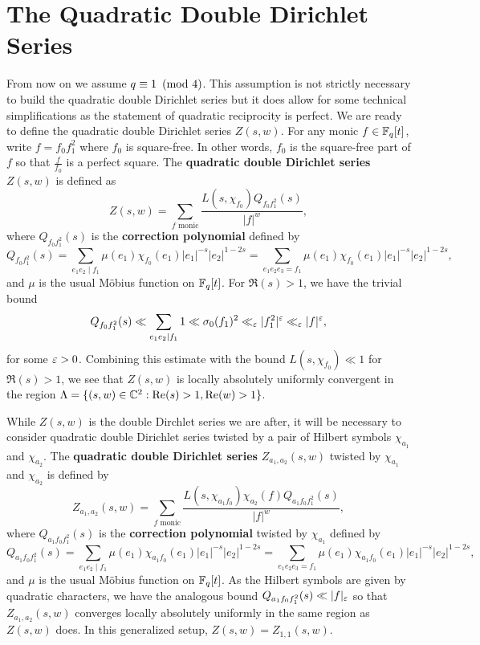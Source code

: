 \documentclass[12pt,reqno,oneside]{amsart}
\begin{document}
\section{The Quadratic Double Dirichlet Series}
    From now on we assume $q \equiv 1 \ \left(\text{mod }4\right)$. This assumption is not strictly necessary to build the quadratic double Dirichlet series but it does allow for some technical simplifications as the statement of quadratic reciprocity is perfect. We are ready to define the quadratic double Dirichlet series $Z(s,w)$. For any monic $f \in \mathbb{F}_{q}[t]$, write $f = f_{0}f_{1}^{2}$ where $f_{0}$ is square-free. In other words, $f_{0}$ is the square-free part of $f$ so that $\frac{f}{f_{0}}$ is a perfect square. The \textbf{quadratic double Dirichlet series} $Z(s,w)$ is defined as
    \[
        Z(s,w) = \sum_{\text{$f$ monic}}\frac{L(s,\chi_{f_{0}})Q_{f_{0}f_{1}^{2}}(s)}{|f|^{w}},
    \]
    where $Q_{f_{0}f_{1}^{2}}(s)$ is the \textbf{correction polynomial} defined by
    \[
        Q_{f_{0}f_{1}^{2}}(s) = \sum_{e_{1}e_{2} \mid f_{1}}\mu(e_{1})\chi_{f_{0}}(e_{1})|e_{1}|^{-s}|e_{2}|^{1-2s} = \sum_{e_{1}e_{2}e_{3} = f_{1}}\mu(e_{1})\chi_{f_{0}}(e_{1})|e_{1}|^{-s}|e_{2}|^{1-2s},
    \]
    and $\mu$ is the usual M\"obius function on $\mathbb{F}_{q}[t]$. For $\Re(s) > 1$, we have the trivial bound
    \[
        Q_{f_{0}f_{1}^{2}}(s) \ll \sum_{e_{1}e_{2} \mid f_{1}}1 \ll \sigma_{0}(f_{1})^{2} \ll_{\varepsilon} |f_{1}^{2}|^{\varepsilon} \ll_{\varepsilon} |f|^{\varepsilon},
    \]
    for some $\varepsilon > 0$. Combining this estimate with the bound $L(s,\chi_{f_{0}}) \ll 1$ for $\Re(s) > 1$, we see that $Z(s,w)$ is locally absolutely uniformly convergent in the region $\Lambda = \{(s,w) \in \mathbb{C}^{2}:\mathrm{Re}(s) > 1, \mathrm{Re}(w) > 1\}$.

    While $Z(s,w)$ is the double Dirchlet series we are after, it will be necessary to consider quadratic double Dirichlet series twisted by a pair of Hilbert symbols $\chi_{a_{1}}$ and $\chi_{a_{2}}$. The \textbf{quadratic double Dirichlet series} $Z_{a_{1},a_{2}}(s,w)$ twisted by $\chi_{a_{1}}$ and $\chi_{a_{2}}$ is defined by
    \[
        Z_{a_{1},a_{2}}(s,w) = \sum_{\text{$f$ monic}}\frac{L(s,\chi_{a_{1}f_{0}})\chi_{a_{2}}(f)Q_{a_{1}f_{0}f_{1}^{2}}(s)}{|f|^{w}},
    \]
    where $Q_{a_{1}f_{0}f_{1}^{2}}(s)$ is the \textbf{correction polynomial} twisted by $\chi_{a_{1}}$ defined by
    \[
        Q_{a_{1}f_{0}f_{1}^{2}}(s) = \sum_{e_{1}e_{2} \mid f_{1}}\mu(e_{1})\chi_{a_{1}f_{0}}(e_{1})|e_{1}|^{-s}|e_{2}|^{1-2s} = \sum_{e_{1}e_{2}e_{3} = f_{1}}\mu(e_{1})\chi_{a_{1}f_{0}}(e_{1})|e_{1}|^{-s}|e_{2}|^{1-2s},
    \]
    and $\mu$ is the usual M\"obius function on $\mathbb{F}_{q}[t]$. As the Hilbert symbols are given by quadratic characters, we have the analogous bound $Q_{a_{1}f_{0}f_{1}^{2}}(s) \ll |f|_{\varepsilon}$ so that $Z_{a_{1},a_{2}}(s,w)$ converges locally absolutely uniformly in the same region as $Z(s,w)$ does. In this generalized setup, $Z(s,w) = Z_{1,1}(s,w)$.
\end{document}
